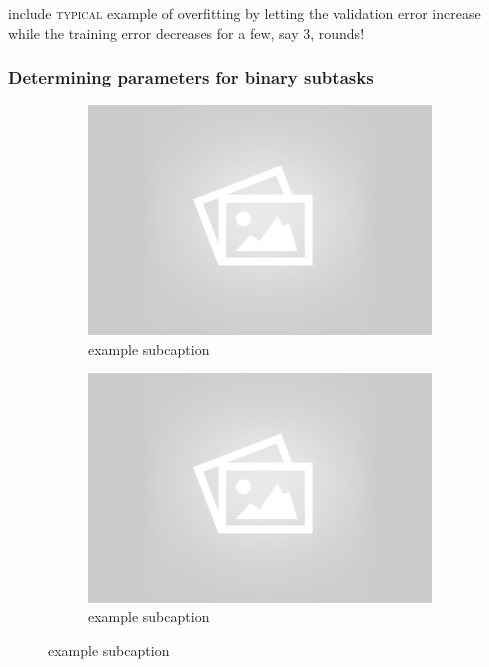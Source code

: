 include \textsc{typical} example of overfitting by letting the validation error increase while the training error decreases for a few, say 3, rounds!

\subsubsection{Determining parameters for binary subtasks}

\begin{figure}[!ht]
	\centering
		\begin{subfigure}[b]{.45\textwidth}
		\centering
		\includegraphics[width=\textwidth]{mlp/placeholder.png}
		\caption{example subcaption}
		\end{subfigure}
	\quad
	\begin{subfigure}[b]{.45\textwidth}
	\centering
	\includegraphics[width=\textwidth]{mlp/placeholder.png}
	\caption{example subcaption}

\end{subfigure}
\end{figure}
